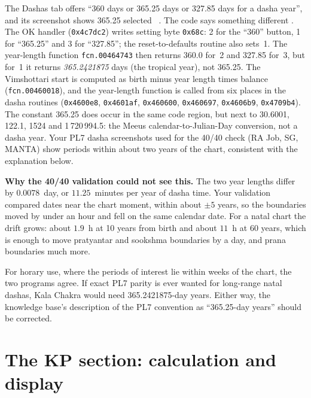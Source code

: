 The Dashas tab offers ``360 days or 365.25 days or 327.85 days for a dasha year'', and its
screenshot shows 365.25 selected \tagDOC\ \parencite[pp.~193--194]{geovision2006pl7}. The
code says something different \tagBIN. The OK handler (\texttt{0x4c7dc2}) writes setting byte
\texttt{0x68c}: 2 for the ``360'' button, 1 for ``365.25'' and 3 for ``327.85''; the
reset-to-defaults routine also sets~1. The year-length function \texttt{fcn.00464743} then
returns 360.0 for~2 and 327.85 for~3, but for~1 it returns \emph{365.2421875} days (the
tropical year), not 365.25. The Vimshottari start is computed as birth minus year length
times balance (\texttt{fcn.00460018}), and the year-length function is called from six places in
the dasha routines (\texttt{0x4600e8}, \texttt{0x4601af}, \texttt{0x460600}, \texttt{0x460697},
\texttt{0x4606b9}, \texttt{0x4709b4}). The constant 365.25 does occur in the same code region, but
next to 30.6001, 122.1, 1524 and 1\,720\,994.5: the Meeus calendar-to-Julian-Day conversion, not
a dasha year. Your PL7 dasha screenshots used for the 40/40 check (RA Job, SG, MANTA) show
periods within about two years of the chart, consistent with the explanation below.

\begin{derivbox}
\textbf{Why the 40/40 validation could not see this.} The two year lengths differ by
$0.0078$~day, or $11.25$~minutes per year of dasha time. Your validation compared dates
near the chart moment, within about $\pm 5$ years, so the boundaries moved by under an hour
and fell on the same calendar date. For a natal chart the drift grows: about $1.9$~h at 10
years from birth and about $11$~h at 60 years, which is enough to move pratyantar and
sookshma boundaries by a day, and prana boundaries much more.
\end{derivbox}

For horary use, where the periods of interest lie within weeks of the chart, the two
programs agree. If exact PL7 parity is ever wanted for long-range natal dashas, Kala Chakra
would need 365.2421875-day years. Either way, the knowledge base's description of the PL7
convention as ``365.25-day years'' should be corrected.

\section{The KP section: calculation and display}
\label{sec:kp}

